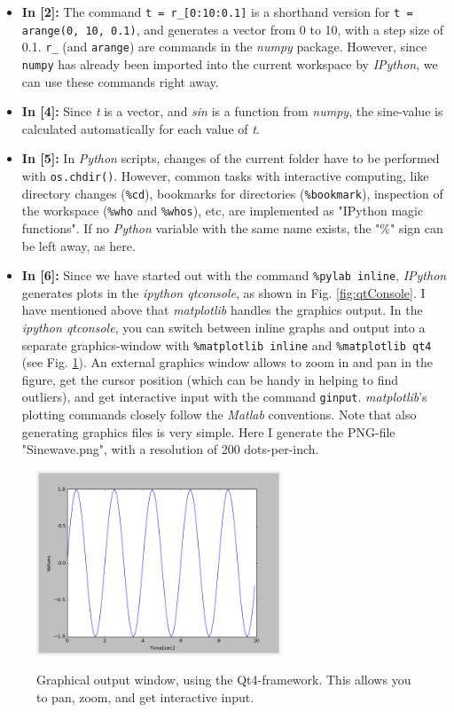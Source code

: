 \begin{itemize}
  \item \textbf{In [2]:} The command \lstinline{t = r_[0:10:0.1]} is a shorthand version for \lstinline{t = arange(0, 10, 0.1)}, and generates a vector from 0 to 10, with a step size of 0.1.  \lstinline{r_} (and \lstinline{arange}) are commands in the \emph{numpy}  package. However, since \lstinline{numpy} has already been imported into the current workspace by \emph{IPython}, we can use these commands right away.
  \item \textbf{In [4]:} Since \emph{t} is a vector, and \emph{sin} is a function from \emph{numpy}, the sine-value is calculated automatically for each value of \emph{t}.
  \item \textbf{In [5]:} In \emph{Python} scripts, changes of the current folder have to be performed with \lstinline{os.chdir()}. However, common tasks with interactive computing, like directory changes (\lstinline{%cd}), bookmarks for directories (\lstinline{%bookmark}), inspection of the workspace (\lstinline{%who} and \lstinline{%whos}), etc, are implemented as "IPython magic functions". If no \emph{Python} variable with the same name exists, the "\%" sign can be left away, as here.
  \item \textbf{In [6]:} Since we have started out with the command \lstinline{%pylab inline}, \emph{IPython} generates plots in the \emph{ipython qtconsole}, as shown in Fig. \ref{fig:qtConsole}. I have mentioned above that \emph{matplotlib} handles the graphics output. In the \emph{ipython qtconsole}, you can switch between inline graphs and output into a separate graphics-window with \lstinline{%matplotlib inline} and \lstinline{%matplotlib qt4} (see Fig. \ref{fig:qt4}). An external graphics window allows to zoom in and pan in the figure, get the cursor position (which can be handy in helping to find outliers), and get interactive input with the command \lstinline{ginput}. \emph{matplotlib}'s plotting commands closely follow the \emph{Matlab} conventions. Note that also generating graphics files is very simple. Here I generate the PNG-file "Sinewave.png", with a resolution of 200 dots-per-inch.
\end{itemize}

\begin{figure}
  \centering
  \includegraphics[width=0.65\textwidth]{../Images/qt4.png}\\
  \caption{Graphical output window, using the Qt4-framework. This allows you to pan, zoom, and get interactive input.}
  \label{fig:qt4}
\end{figure}


